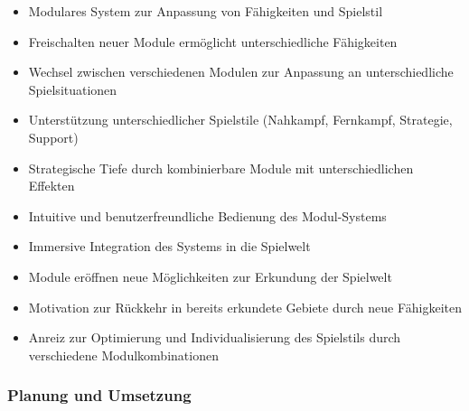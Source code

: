 \begin{itemize}
    \item Modulares System zur Anpassung von Fähigkeiten und Spielstil
    \item Freischalten neuer Module ermöglicht unterschiedliche Fähigkeiten
    \item Wechsel zwischen verschiedenen Modulen zur Anpassung an unterschiedliche Spielsituationen
    \item Unterstützung unterschiedlicher Spielstile (Nahkampf, Fernkampf, Strategie, Support)
    \item Strategische Tiefe durch kombinierbare Module mit unterschiedlichen Effekten
    \item Intuitive und benutzerfreundliche Bedienung des Modul-Systems
    \item Immersive Integration des Systems in die Spielwelt
    \item Module eröffnen neue Möglichkeiten zur Erkundung der Spielwelt
    \item Motivation zur Rückkehr in bereits erkundete Gebiete durch neue Fähigkeiten
    \item Anreiz zur Optimierung und Individualisierung des Spielstils durch verschiedene Modulkombinationen
\end{itemize}

\subsubsection{Planung und Umsetzung}